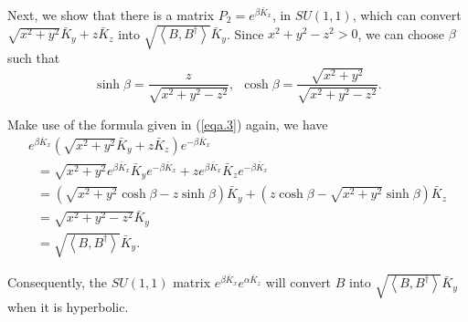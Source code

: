 \documentclass[onecolumn,showpacs,showkeys,preprintnumbers]{revtex4}
\begin{document}
Next, we show that there is a matrix $P_2=e^{\beta\bar{K}_x}$, in
$SU(1,1)$, which can convert $\sqrt{x^2+y^2}\bar{K}_y+z\bar{K}_z$
into $\sqrt{\left<B,B^\dag\right>}\bar{K}_y$. Since
$x^2+y^2-z^2>0$, we can choose $\beta$ such that
\noindent\begin{equation}\label{eqa.5}\sinh\beta=\frac{z}{\sqrt{x^2+y^2-z^2}},~~\cosh\beta=\frac{\sqrt{x^2+y^2}}{\sqrt{x^2+y^2-z^2}}.
\end{equation}

\noindent Make use of the formula given in (\ref{eqa.3}) again, we
have
\noindent\begin{equation}\label{eqa.4}\begin{array}{l}
   e^{\beta\bar{K}_x}(\sqrt{x^2+y^2}\bar{K}_y+z\bar{K}_z)e^{-\beta\bar{K}_x}\\
   ~~~=\sqrt{x^2+y^2}e^{\beta\bar{K}_x}\bar{K}_ye^{-\beta\bar{K}_x}+ze^{\beta\bar{K}_x}\bar{K}_ze^{-\beta\bar{K}_x}\\
   ~~~=(\sqrt{x^2+y^2}\cosh\beta-z\sinh\beta)\bar{K}_y+(z\cosh\beta-\sqrt{x^2+y^2}\sinh\beta)\bar{K}_z\\
   ~~~=\sqrt{x^2+y^2-z^2}\bar{K}_y\\
   ~~~=\sqrt{\left<B,B^\dag\right>}\bar{K}_y.
\end{array}
\end{equation}

Consequently, the $SU(1,1)$ matrix
$e^{\beta\bar{K}_x}e^{\alpha\bar{K}_z}$ will convert $B$ into
$\sqrt{\left<B,B^\dag\right>}\bar{K}_y$ when it is hyperbolic.
\end{document}
